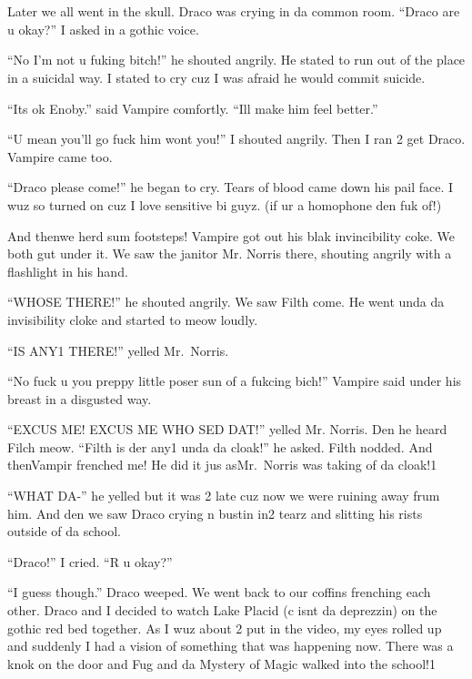 \section{}



Later we all went in the skull. Draco was crying in da common room. \enquote{Draco are u okay?} I asked in a gothic voice.

\enquote{No I'm not u fuking bitch!} he shouted angrily. He stated to run out of the place in a suicidal way. I stated to cry cuz I was afraid he would commit suicide.

\enquote{Its ok Enoby.} said Vampire comfortly. \enquote{Ill make him feel better.}

\enquote{U mean you'll go fuck him wont you!} I shouted angrily. Then I ran 2 get Draco. Vampire came too.

\enquote{Draco please come!} he began to cry. Tears of blood came down his pail face. I wuz so turned on cuz I love sensitive bi guyz. (if ur a homophone den fuk of!)

And then\dotfill we herd sum footsteps! Vampire got out his blak invincibility coke. We both gut under it. We saw the janitor Mr. Norris there, shouting angrily with a flashlight in his hand.

\enquote{WHOSE THERE\@!} he shouted angrily. We saw Filth come. He went unda da invisibility cloke and started to meow loudly.

\enquote{IS ANY1 THERE\@!} yelled Mr.~Norris.

\enquote{No fuck u you preppy little poser sun of a fukcing bich!} Vampire said under his breast in a disgusted way.

\enquote{EXCUS ME\@! EXCUS ME WHO SED DAT\@!} yelled Mr. Norris. Den he heard Filch meow. \enquote{Filth is der any1 unda da cloak!} he asked. Filth nodded. And then\dotfill\newline Vampir frenched me! He did it jus as\dotfill\newline Mr.~Norris was taking of da cloak!1

\enquote{WHAT DA-} he yelled but it was 2 late cuz now we were ruining away frum him. And den we saw Draco crying n bustin in2 tearz and slitting his rists outside of da school.

\enquote{Draco!} I cried. \enquote{R u okay?}

\enquote{I guess though.} Draco weeped. We went back to our coffins frenching each other. Draco and I decided to watch Lake Placid (c isnt da deprezzin) on the gothic red bed together. As I wuz about 2 put in the video, my eyes rolled up and suddenly I had a vision of something that was happening now. There was a knok on the door and Fug and da Mystery of Magic walked into the school!1

